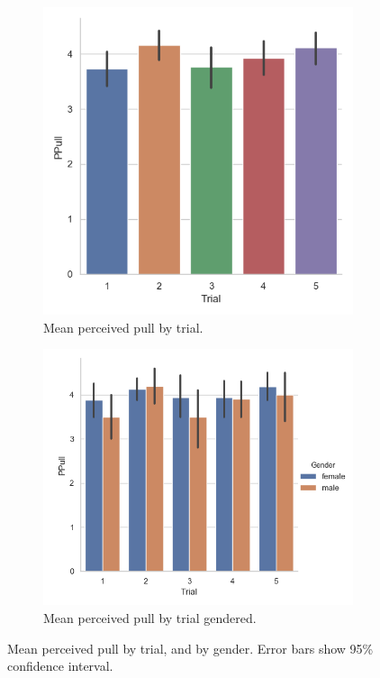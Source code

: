  \begin{figure}[H]
 \begin{subfigure}[b]{0.5\textwidth}
     \centering
     \includegraphics[scale=0.5]{Files/Plots/ppull_by_trial_mean.png}
     \caption{Mean perceived pull by trial.}
     \label{fig:meanPpullTrial}
 \end{subfigure}
  \begin{subfigure}[b]{0.5\textwidth}
     \centering
     \includegraphics[scale=0.5]{Files/Plots/ppull_by_trial_mean_gen.png}
     \caption{Mean perceived pull by trial gendered.}
     \label{fig:meanPPullGenTrial}
 \end{subfigure}
     \caption{Mean perceived pull by trial, and by gender.  Error bars show 95\%  confidence interval.}
    \label{fig:ppullByTrial}
\end{figure}


